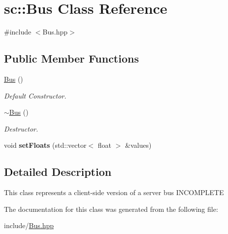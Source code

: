 \hypertarget{classsc_1_1Bus}{\section{sc\-:\-:Bus Class Reference}
\label{classsc_1_1Bus}
}


{\ttfamily \#include $<$Bus.\-hpp$>$}

\subsection*{Public Member Functions}
\begin{DoxyCompactItemize}
\item 
\hypertarget{classsc_1_1Bus_aac624ad70954d12fb9f46190c791e647}{\hyperlink{classsc_1_1Bus_aac624ad70954d12fb9f46190c791e647}{Bus} ()}\label{classsc_1_1Bus_aac624ad70954d12fb9f46190c791e647}

\begin{DoxyCompactList}\small\item\em Default Constructor. \end{DoxyCompactList}\item 
\hypertarget{classsc_1_1Bus_acfbc415ad3d4399e21e6ffceae1767af}{\hyperlink{classsc_1_1Bus_acfbc415ad3d4399e21e6ffceae1767af}{$\sim$\-Bus} ()}\label{classsc_1_1Bus_acfbc415ad3d4399e21e6ffceae1767af}

\begin{DoxyCompactList}\small\item\em Destructor. \end{DoxyCompactList}\item 
\hypertarget{classsc_1_1Bus_a1aa845a957aea8e48c3b41fb78878222}{void {\bfseries set\-Floats} (std\-::vector$<$ float $>$ \&values)}\label{classsc_1_1Bus_a1aa845a957aea8e48c3b41fb78878222}

\end{DoxyCompactItemize}


\subsection{Detailed Description}
This class represents a client-\/side version of a server bus I\-N\-C\-O\-M\-P\-L\-E\-T\-E 

The documentation for this class was generated from the following file\-:\begin{DoxyCompactItemize}
\item 
include/\hyperlink{Bus_8hpp}{Bus.\-hpp}\end{DoxyCompactItemize}
